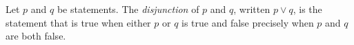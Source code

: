 \guard





\begin{defn}
\label{defn:disjunctionOfStatement}
  Let $p$ and $q$ be statements.
  The \emph{disjunction} of $p$ and $q$, written $p \vee q$, is the statement that is true when either $p$ or $q$ is true and false precisely when $p$ and $q$ are both false.
\end{defn}
